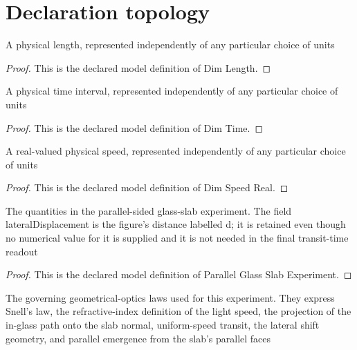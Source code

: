 \section{Declaration topology}
\begin{definition}
  \label{def:physics:phyx-mini-0003:phyxmini0003-dimlength}
  A physical length, represented independently of any particular choice of units
\end{definition}
\begin{proof}
  This is the declared model definition of Dim Length.
\end{proof}
\begin{definition}
  \label{def:physics:phyx-mini-0003:phyxmini0003-dimtime}
  A physical time interval, represented independently of any particular choice of units
\end{definition}
\begin{proof}
  This is the declared model definition of Dim Time.
\end{proof}
\begin{definition}
  \label{def:physics:phyx-mini-0003:phyxmini0003-dimspeedreal}
  A real-valued physical speed, represented independently of any particular choice of units
\end{definition}
\begin{proof}
  This is the declared model definition of Dim Speed Real.
\end{proof}
\begin{definition}
  \label{def:physics:phyx-mini-0003:phyxmini0003-parallelglassslabexperiment}
  The quantities in the parallel-sided glass-slab experiment. The field lateralDisplacement is the figure's distance labelled d; it is retained even though no numerical value for it is supplied and it is not needed in the final transit-time readout
\end{definition}
\begin{proof}
  This is the declared model definition of Parallel Glass Slab Experiment.
\end{proof}
\begin{definition}
  \label{def:physics:phyx-mini-0003:phyxmini0003-parallelglassslabgoverninglaws}
  The governing geometrical-optics laws used for this experiment. They express Snell's law, the refractive-index definition of the light speed, the projection of the in-glass path onto the slab normal, uniform-speed transit, the lateral shift geometry, and parallel emergence from the slab's parallel faces
\end{definition}
